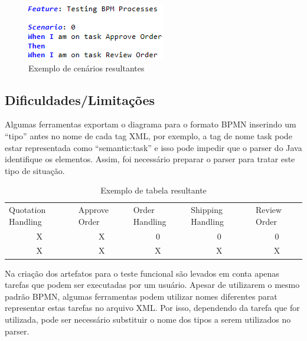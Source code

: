 \documentclass[12pt]{article}
\begin{document}
\begin{figure}[ht]
\centering
\includegraphics[width=.5\textwidth]{figuras/exemplo_cenario.png}
\caption{Exemplo de cenários resultantes}
\label{fig:exemplo_cenario}
\end{figure}


\subsection{Dificuldades/Limitações}
Algumas ferramentas exportam o diagrama para o formato BPMN inserindo um ``tipo'' antes no nome de cada tag XML, por exemplo, a tag de nome task pode estar representada como ``semantic:task'' e isso pode impedir que o parser do Java identifique os elementos. Assim, foi necessário preparar o parser para tratar este tipo de situação.

\begin{table}[]
\centering
\caption{Exemplo de tabela resultante}
\label{tab:exemplo}
\begin{tabular}{ccccc}
\multicolumn{1}{l}{Quotation Handling} & \multicolumn{1}{l}{Approve Order} & \multicolumn{1}{l}{Order Handling} & \multicolumn{1}{l}{Shipping Handling} & \multicolumn{1}{l}{Review Order} \\
X & X & 0 & 0 & 0 \\
X & X & X & X & X
\end{tabular}
\end{table}


Na criação dos artefatos para o teste funcional são levados em conta apenas tarefas que podem ser executadas por um usuário. Apesar de utilizarem o mesmo padrão BPMN, algumas ferramentas podem utilizar nomes diferentes parat representar estas tarefas no arquivo XML. Por isso, dependendo da tarefa que for utilizada, pode ser necessário substituir o nome dos tipos a serem utilizados no parser.


\end{document}
